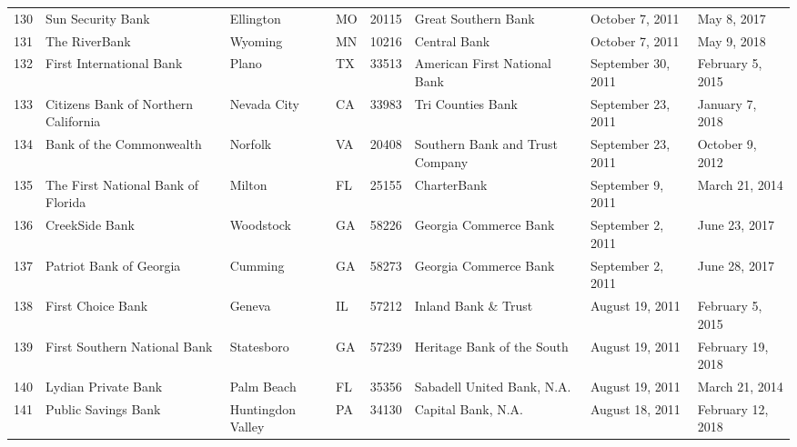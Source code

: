 \begin{tabular}{llllrlll}
130 &                                  Sun Security Bank &           Ellington &  MO &  20115 &                                Great Southern Bank &     October 7, 2011 &         May 8, 2017 \\
131 &                                      The RiverBank &             Wyoming &  MN &  10216 &                                       Central Bank &     October 7, 2011 &         May 9, 2018 \\
132 &                           First International Bank &               Plano &  TX &  33513 &                       American First National Bank &  September 30, 2011 &    February 5, 2015 \\
133 &               Citizens Bank of Northern California &         Nevada City &  CA &  33983 &                                  Tri Counties Bank &  September 23, 2011 &     January 7, 2018 \\
134 &                           Bank of the Commonwealth &             Norfolk &  VA &  20408 &                    Southern Bank and Trust Company &  September 23, 2011 &     October 9, 2012 \\
135 &                 The First National Bank of Florida &              Milton &  FL &  25155 &                                        CharterBank &   September 9, 2011 &      March 21, 2014 \\
136 &                                     CreekSide Bank &           Woodstock &  GA &  58226 &                              Georgia Commerce Bank &   September 2, 2011 &       June 23, 2017 \\
137 &                            Patriot Bank of Georgia &             Cumming &  GA &  58273 &                              Georgia Commerce Bank &   September 2, 2011 &       June 28, 2017 \\
138 &                                  First Choice Bank &              Geneva &  IL &  57212 &                                Inland Bank \& Trust &     August 19, 2011 &    February 5, 2015 \\
139 &                       First Southern National Bank &          Statesboro &  GA &  57239 &                         Heritage Bank of the South &     August 19, 2011 &   February 19, 2018 \\
140 &                                Lydian Private Bank &          Palm Beach &  FL &  35356 &                         Sabadell United Bank, N.A. &     August 19, 2011 &      March 21, 2014 \\
141 &                                Public Savings Bank &   Huntingdon Valley &  PA &  34130 &                                 Capital Bank, N.A. &     August 18, 2011 &   February 12, 2018 \\

\end{tabular}
